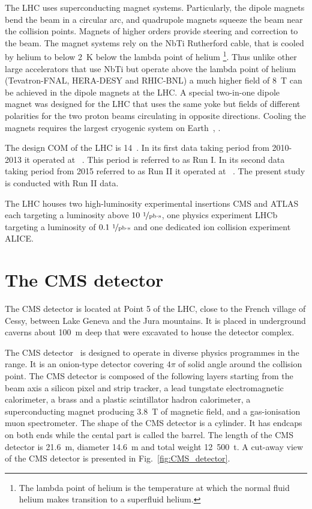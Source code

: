 The LHC uses superconducting magnet systems. Particularly, the dipole magnets bend the beam in a circular arc, and quadrupole magnets squeeze the beam near the collision points. Magnets of higher orders provide steering and correction to the beam. The magnet systems rely on the NbTi Rutherford cable, that is cooled by helium to below 2~K \textendash below the lambda point of helium \footnote{The lambda point of helium is the temperature at which the normal fluid helium makes transition to a superfluid helium.}. Thus unlike other large accelerators that use NbTi but operate above the lambda point of helium (Tevatron-FNAL, HERA-DESY and RHIC-BNL) a much higher field of 8~T can be achieved in the dipole magnets at the LHC. A special two-in-one dipole magnet was designed for the LHC that uses the same yoke but fields of different polarities for the two proton beams circulating in opposite directions. Cooling the magnets requires the largest cryogenic system on Earth~\cite{MYERS:2013hra}, \cite{Evans:2008zzb}.

The design COM of the LHC is 14~\TeV. In its first data taking period from 2010-2013 it operated at ~\TeV. This period is referred to as Run I. In its second data taking period from 2015 referred to as Run II it operated at ~\TeV. The present study is conducted with Run II data.

The LHC houses two high-luminosity experimental insertions \textendash CMS and ATLAS each targeting a luminosity above $10~{\nicefrac{1}{\text{pb}\cdot\text{s}}}$, one \cPqb physics experiment LHCb targeting a luminosity of $0.1~\nicefrac{1}{\text{pb}\cdot\text{s}}$ and one dedicated ion collision experiment \textendash ALICE. 

\section{The CMS detector}

The CMS detector is located at Point 5 of the LHC, close to the French village of Cessy, between Lake Geneva and the Jura mountains. It is placed in underground caverns about 100~m deep that were excavated to house the detector complex.

The CMS detector~\cite{Chatrchyan:2008aa} is designed to operate in diverse physics programmes in the \TeV range. It is an onion-type detector covering $4\pi$ of solid angle around the collision point. The CMS detector is composed of the following layers starting from the beam axis \textendash a silicon pixel and strip tracker, a lead tungstate electromagnetic calorimeter, a brass and a plastic scintillator hadron calorimeter, a superconducting magnet producing 3.8~T of magnetic field, and a gas-ionisation muon spectrometer. The shape of the CMS detector is a cylinder. It has endcaps on both ends while the cental part is called the barrel. The length of the CMS detector is 21.6~m, diameter 14.6~m and total weight 12~500~t. A cut-away view of the CMS detector is presented in Fig.~\ref{fig:CMS_detector}.

